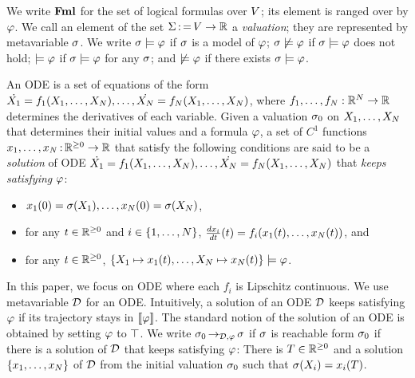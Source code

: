\documentclass[acmsmall,review,anonymous]{acmart}\settopmatter{printfolios=true,printccs=false,printacmref=false}
\begin{document}
  We write
$\mathbf{Fml}$ for the set of logical formulas over $V$; its element is
ranged over by $\varphi$.   We call an element
of the set $\Sigma \operatorname{{:=}} V \rightarrow \mathbb{R}$ a \emph{valuation};
they are represented by metavariable $\sigma$.  We write
$\sigma \models \varphi$ if $\sigma$ is a model of $\varphi$;
$\sigma \not\models \varphi$ if $\sigma \models \varphi$ does not
hold; $\models \varphi$ if $\sigma \models \varphi$ for any
$\sigma$; and $\not\models \varphi$ if there exists
$\sigma \models \varphi$.  

  An ODE is a set of
equations of the form
$\dot{X_1} = f_1(X_1,\dots,X_N), \dots, \dot{X_N} =
f_N(X_1,\dots,X_N)$, where $f_1,\dots,f_N : \mathbb{R}^N \rightarrow \mathbb{R}$
determines the derivatives of each variable.  Given a valuation
$\sigma_0$ on $X_1,\dots,X_N$ that determines their initial
values and a formula $\varphi$, a set of $C^1$ functions
$x_1,\dots,x_N \operatorname{{:}} \mathbb{R}^{{} \ge 0} \rightarrow \mathbb{R}$ that satisfy the
following conditions are said to be a \emph{solution} of ODE
$\dot{X_1} = f_1(X_1,\dots,X_N), \dots, \dot{X_N} =
f_N(X_1,\dots,X_N)$ that \emph{keeps satisfying} $\varphi$:
\begin{itemize}
\item
  $x_1(0) = \sigma(X_1),\dots,x_N(0) =
  \sigma(X_N)$,
\item for any $t \in \mathbb{R}^{{} \ge 0}$ and $i \in \left\{{1,\dots,N}\right\}$,
  $\frac{d{x_i}}{dt}(t) = f_i(x_1(t),\dots,x_N(t))$, and
\item for any $t \in \mathbb{R}^{{} \ge 0}$,
  $\left\{{X_1 \mapsto x_1(t),\dots,X_N \mapsto x_N(t)}\right\}
  \models \varphi$.
\end{itemize}
  In this
paper, we focus on ODE where each $f_i$ is Lipschitz continuous.  We
use metavariable $\mathcal{D}$ for an ODE.  Intuitively, a solution of an ODE
$\mathcal{D}$ keeps satisfying $\varphi$ if its trajectory stays in
$\left\llbracket{\varphi}\right\rrbracket$.  The standard notion of the solution of an ODE is
obtained by setting $\varphi$ to $\top$.  We write
$\sigma_0 \operatorname{\rightarrow_{\mathcal{D},{\varphi}}} \sigma$ if $\sigma$ is
reachable form $\sigma_0$ if there is a solution of $\mathcal{D}$ that
keeps satisfying $\varphi$: There is $T \in \mathbb{R}^{{} \ge 0}$ and a solution
$\left\{{x_1,\dots,x_N}\right\}$ of $\mathcal{D}$ from the initial valuation
$\sigma_0$ such that $\sigma(X_i) = x_i(T)$.
\end{document}
